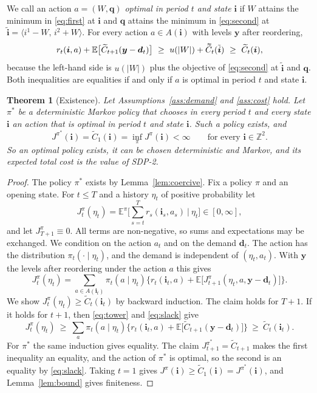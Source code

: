 \documentclass[11pt]{article}
\DeclareRobustCommand{\dbtilde}[1]{\accentset{\approx}{#1}}
\renewcommand{\vec}[1]{\boldsymbol{#1}}
\newcommand{\E}{\mathbb{E}}
\newcommand{\Z}{\mathbb{Z}}
\newcommand{\Ct}{\widetilde{C}}
\newcommand{\Cq}{\dbtilde{C}}
\newtheorem{theorem}{Theorem}
\theoremstyle{definition}
\begin{document}
We call an action $a=(W,\vec{q})$ \emph{optimal in period $t$ and state $\vec{i}$} if $W$ attains the minimum in \eqref{eq:first} at $\vec{i}$ and $\vec{q}$ attains the minimum in \eqref{eq:second} at $\tilde{\vec{i}}=\langle i^1-W,\,i^2+W\rangle$. For every action $a\in A(\vec{i})$ with levels $\vec{y}$ after reordering,
\begin{equation}\label{eq:slack}
r_t(\vec{i},a)+\E\big[\Ct_{t+1}(\vec{y}-\vec{d}_t)\big]\ \ge\ u(|W|)+\Cq_t(\tilde{\vec{i}})\ \ge\ \Ct_t(\vec{i}),
\end{equation}
because the left-hand side is $u(|W|)$ plus the objective of \eqref{eq:second} at $\tilde{\vec{i}}$ and $\vec{q}$. Both inequalities are equalities if and only if $a$ is optimal in period $t$ and state $\vec{i}$.

\begin{theorem}[Existence]\label{thm:existence}
Let Assumptions~\ref{ass:demand} and \ref{ass:cost} hold. Let $\pi^*$ be a deterministic Markov policy that chooses in every period $t$ and every state $\vec{i}$ an action that is optimal in period $t$ and state $\vec{i}$. Such a policy exists, and
\[
J^{\pi^*}(\vec{i})=\Ct_1(\vec{i})=\inf_{\pi}J^{\pi}(\vec{i})<\infty\qquad\text{for every }\vec{i}\in\Z^2 .
\]
So an optimal policy exists, it can be chosen deterministic and Markov, and its expected total cost is the value of SDP-2.
\end{theorem}

\begin{proof}
The policy $\pi^*$ exists by Lemma~\ref{lem:coercive}. Fix a policy $\pi$ and an opening state. For $t\le T$ and a history $\eta_t$ of positive probability let
\[
J^\pi_t(\eta_t)=\E^\pi\Big[\sum_{s=t}^T r_s(\vec{i}_s,a_s)\ \Big|\ \eta_t\Big]\in[0,\infty],
\]
and let $J^\pi_{T+1}\equiv0$. All terms are non-negative, so sums and expectations may be exchanged. We condition on the action $a_t$ and on the demand $\vec{d}_t$. The action has the distribution $\pi_t(\cdot\mid\eta_t)$, and the demand is independent of $(\eta_t,a_t)$. With $\vec{y}$ the levels after reordering under the action $a$ this gives
\begin{equation}\label{eq:tower}
J^\pi_t(\eta_t)=\sum_{a\in A(\vec{i}_t)}\pi_t(a\mid\eta_t)\Big\{r_t(\vec{i}_t,a)+\E\big[J^\pi_{t+1}(\eta_t,a,\vec{y}-\vec{d}_t)\big]\Big\}.
\end{equation}
We show $J^\pi_t(\eta_t)\ge\Ct_t(\vec{i}_t)$ by backward induction. The claim holds for $T+1$. If it holds for $t+1$, then \eqref{eq:tower} and \eqref{eq:slack} give
\[
J^\pi_t(\eta_t)\ \ge\ \sum_{a}\pi_t(a\mid\eta_t)\Big\{r_t(\vec{i}_t,a)+\E\big[\Ct_{t+1}(\vec{y}-\vec{d}_t)\big]\Big\}\ \ge\ \Ct_t(\vec{i}_t).
\]
For $\pi^*$ the same induction gives equality. The claim $J^{\pi^*}_{t+1}=\Ct_{t+1}$ makes the first inequality an equality, and the action of $\pi^*$ is optimal, so the second is an equality by \eqref{eq:slack}. Taking $t=1$ gives $J^{\pi}(\vec{i})\ge\Ct_1(\vec{i})=J^{\pi^*}(\vec{i})$, and Lemma~\ref{lem:bound} gives finiteness.
\end{proof}
\end{document}
